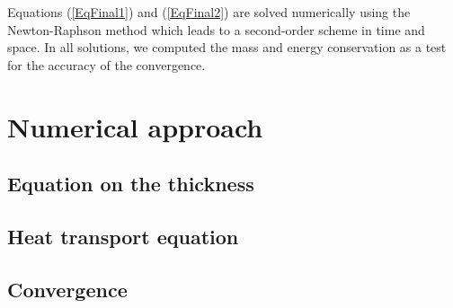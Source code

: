  Equations   (\ref{EqFinal1})   and    (\ref{EqFinal2})   are   solved
 numerically  using  the  Newton-Raphson   method  which  leads  to  a
 second-order scheme in time and  space. In all solutions, we computed
 the mass  and energy conservation as  a test for the  accuracy of the
 convergence.

  \section{Numerical approach}
  \label{sec:numerical-approach}

  \subsection{Equation on the thickness}
  \label{sec:equation-thickness}

  \subsection{Heat transport equation}
  \label{sec:heat-transp-equat}

  \subsection{Convergence}
  \label{sec:convergence}




